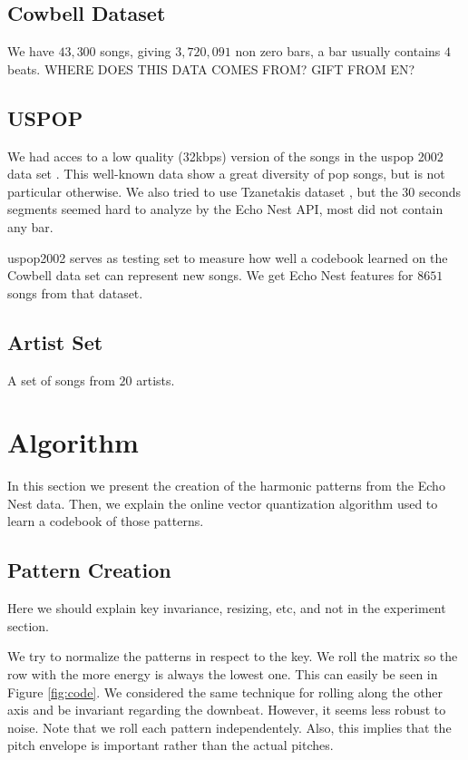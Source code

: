 \documentclass{article}
\begin{document}
\subsection{Cowbell Dataset}
We have $43,300$ songs, giving  $3,720,091$ non zero bars, a bar usually 
contains $4$ beats. WHERE DOES THIS DATA COMES FROM? GIFT FROM EN?

\subsection{USPOP}
We had acces to a low quality (32kbps) version of the songs in the uspop 2002 
data set \cite{uspop2002}.
This well-known data show a great diversity of pop songs, but is not particular
otherwise. We also tried to use Tzanetakis dataset \cite{Tzanetakis2002a}, but 
the $30$ seconds segments seemed hard to analyze by the Echo Nest API, most did
not contain any bar.

uspop2002 serves as testing set to measure how well a codebook learned on
the Cowbell data set can represent new songs. We get Echo Nest features
for $8651$ songs from that dataset.

\subsection{Artist Set}
A set of songs from $20$ artists.


\section{Algorithm}\label{sec:algo}
In this section we present the creation of the harmonic patterns from
the Echo Nest data. Then, we explain the online vector quantization algorithm
used to learn a codebook of those patterns.

\subsection{Pattern Creation}
Here we should explain key invariance, resizing, etc, and not in the
experiment section.

We try to normalize the patterns in respect to the key. We roll the matrix
so the row with the more energy is always the lowest one. This can easily be
seen in Figure \ref{fig:code}. We considered the same technique for rolling
along the other axis and be invariant regarding the downbeat. However, it
seems less robust to noise. Note that we roll each pattern independentely.
Also, this implies that the pitch envelope is important rather than the actual 
pitches.
\end{document}
